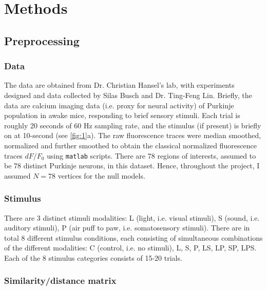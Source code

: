 \section{Methods}

\subsection{Preprocessing}

\subsubsection*{Data}

The data are obtained from Dr. Christian Hansel's lab, with experiments designed and data collected by Silas Busch and Dr. Ting-Feng Lin. Briefly, the data are calcium imaging data (i.e. proxy for neural activity) of Purkinje population in awake mice, responding to brief sensory stimuli. Each trial is roughly 20 seconds of 60 Hz sampling rate, and the stimulus (if present) is briefly on at 10-second (see \autoref{fig:1}a). The raw fluorescence traces were median smoothed, normalized and further smoothed to obtain the  classical normalized fluorescence traces $dF/F_0$ using \texttt{matlab} scripts. There are 78 regions of interests, assumed to be 78 distinct Purkinje neurons, in this dataset. Hence, throughout the project, I assumed $N=78$ vertices for the null models.

\subsubsection*{Stimulus}

There are 3 distinct stimuli modalities: L (light, i.e. visual stimuli), S (sound, i.e. auditory stimuli), P (air puff to paw, i.e. somatosensory stimuli). There are in total 8 different stimulus conditions, each consisting of simultaneous combinations of the different modalities: C (control, i.e. no stimuli), L, S, P, LS, LP, SP, LPS. Each of the 8 stimulus categories consists of 15-20 trials.

\subsubsection*{Similarity/distance matrix}

